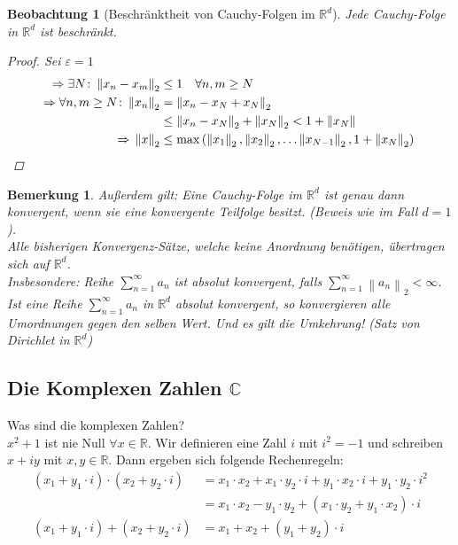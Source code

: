 \documentclass[11pt, twoside, a4paper]{article}
\theoremstyle{plain}
\newtheorem{bemerkung}[blockelement]{Bemerkung}
\newtheorem{beobachtung}[blockelement]{Beobachtung}
\newcommand{\pair}[1]{\left(#1\right)}
\newcommand{\norm}[1]{\left\lVert#1\right\rVert}
\newcommand{\impl}[0]{\Rightarrow{}}
\newcommand{\R}{\mathbb{R}}
\newcommand{\C}{\mathbb{C}}
\begin{document}
    \begin{beobachtung}[Beschränktheit von Cauchy-Folgen im $\R^d$]
        Jede Cauchy-Folge in $\R^d$ ist beschränkt.
        \begin{proof}
            Sei $\varepsilon = 1$
            \begin{align*}
                \impl \exists N\colon\norm{x_n-x_m}_2 &\leq 1\quad\forall n,m\geq N\\
                \impl \forall n,m\geq N\colon \norm{x_n}_2 &= \norm{x_n-x_N+x_N}_2\\
                &\leq \norm{x_n-x_N}_2 + \norm{x_N}_2 < 1 + \norm{x_N}\\
                \impl \norm{x}_2 &\leq \max\pair{\norm{x_1}_2, \norm{x_2}_2,\dots\norm{x_{N-1}}_2, 1+\norm{x_N}_2}\qedhere
            \end{align*}
        \end{proof}
    \end{beobachtung}

    \begin{bemerkung}
        Außerdem gilt: Eine Cauchy-Folge im $\R^d$ ist genau dann konvergent, wenn sie eine konvergente Teilfolge besitzt. (Beweis wie im Fall $d=1$).\\
        Alle bisherigen Konvergenz-Sätze, welche keine Anordnung benötigen, übertragen sich auf $\R^d$.\\
        Insbesondere: Reihe $\sum_{n=1}^{\infty} a_n$ ist absolut konvergent, falls $\sum_{n=1}^{\infty} \norm{a_n}_2 < \infty$.\\
        Ist eine Reihe $\sum_{n=1}^{\infty} a_n$ in $\R^d$ absolut konvergent, so konvergieren alle Umordnungen gegen den selben Wert. Und es gilt die Umkehrung! (Satz von Dirichlet in $\R^d$)
    \end{bemerkung}

    \subsection{Die Komplexen Zahlen $\C$}

    Was sind die komplexen Zahlen?\\
    $x^2+1$ ist nie Null $\forall x\in\R$. Wir definieren eine Zahl $i$ mit $i^2=-1$ und schreiben $x+iy$ mit $x,y\in\R$. Dann ergeben sich folgende Rechenregeln:
    \begin{align*}
    (x_1 + y_1\cdot i)
        \cdot (x_2 + y_2\cdot i) &= x_1\cdot x_2 + x_1\cdot y_2\cdot i + y_1 \cdot x_2 \cdot i + y_1\cdot y_2\cdot i^2\\
        &= x_1\cdot x_2 - y_1\cdot y_2 + \pair{x_1\cdot y_2 + y_1\cdot x_2}\cdot i\\
        (x_1+y_1\cdot i) + (x_2 + y_2\cdot i) &= x_1 + x_2 + \pair{y_1+y_2}\cdot i
    \end{align*}
\end{document}
